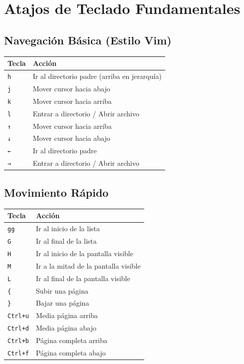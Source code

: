 \documentclass[
  doc,
  floatsintext,
  longtable,
  a4paper,
  nolmodern,
  notxfonts,
  notimes,
  12pt,
  colorlinks=true,linkcolor=blue,citecolor=blue,urlcolor=blue]{apa7}
\newcounter{none} %
\begin{document}
\section{Atajos de Teclado
Fundamentales}\label{atajos-de-teclado-fundamentales}

\subsection{Navegación Básica (Estilo
Vim)}\label{navegaciuxf3n-buxe1sica-estilo-vim}

{\def\LTcaptype{none} %
\begin{longtable}[]{@{}ll@{}}
\toprule\noalign{}
Tecla & Acción \\
\midrule\noalign{}
\endhead
\bottomrule\noalign{}
\endlastfoot
\texttt{h} & Ir al directorio padre (arriba en jerarquía) \\
\texttt{j} & Mover cursor hacia abajo \\
\texttt{k} & Mover cursor hacia arriba \\
\texttt{l} & Entrar a directorio / Abrir archivo \\
\texttt{↑} & Mover cursor hacia arriba \\
\texttt{↓} & Mover cursor hacia abajo \\
\texttt{←} & Ir al directorio padre \\
\texttt{→} & Entrar a directorio / Abrir archivo \\
\end{longtable}
}

\subsection{Movimiento Rápido}\label{movimiento-ruxe1pido}

{\def\LTcaptype{none} %
\begin{longtable}[]{@{}ll@{}}
\toprule\noalign{}
Tecla & Acción \\
\midrule\noalign{}
\endhead
\bottomrule\noalign{}
\endlastfoot
\texttt{gg} & Ir al inicio de la lista \\
\texttt{G} & Ir al final de la lista \\
\texttt{H} & Ir al inicio de la pantalla visible \\
\texttt{M} & Ir a la mitad de la pantalla visible \\
\texttt{L} & Ir al final de la pantalla visible \\
\texttt{\{} & Subir una página \\
\texttt{\}} & Bajar una página \\
\texttt{Ctrl+u} & Media página arriba \\
\texttt{Ctrl+d} & Media página abajo \\
\texttt{Ctrl+b} & Página completa arriba \\
\texttt{Ctrl+f} & Página completa abajo \\
\end{longtable}
}
\end{document}
